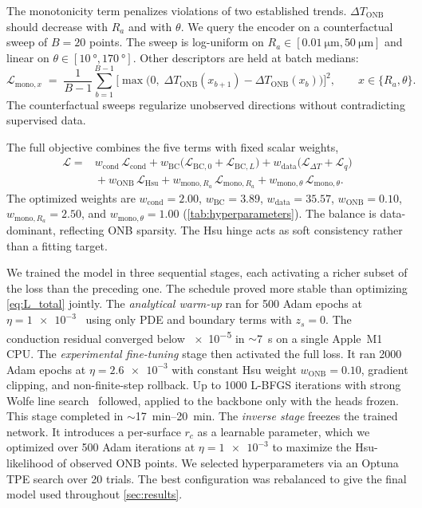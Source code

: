 The monotonicity term penalizes violations of two established trends.
$\Delta T_{\mathrm{ONB}}$ should decrease with $R_a$ and with $\theta$.
We query the encoder on a counterfactual sweep of $B=\num{20}$ points.
The sweep is log-uniform on
$R_a \in [\SI{0.01}{\micro\meter},\SI{50}{\micro\meter}]$ and linear on
$\theta \in [\SI{10}{\degree},\SI{170}{\degree}]$. Other descriptors
are held at batch medians:
%
\begin{equation}\label{eq:L_mono}
\mathcal{L}_{\mathrm{mono},x}
\;=\;
\frac{1}{B-1}
\sum_{b=1}^{B-1}
\bigl[
\max\bigl(0,\;
\Delta T_{\mathrm{ONB}}(x_{b+1}) - \Delta T_{\mathrm{ONB}}(x_{b})
\bigr)
\bigr]^{2},
\qquad x \in \{R_a, \theta\}.
\end{equation}
%
The counterfactual sweeps regularize unobserved directions without
contradicting supervised data.

The full objective combines the five terms with fixed scalar weights,
%
\begin{equation}\label{eq:L_total}
\begin{aligned}
\mathcal{L} = {}
& w_{\mathrm{cond}}\,\mathcal{L}_{\mathrm{cond}}
+ w_{\mathrm{BC}}\bigl(\mathcal{L}_{\mathrm{BC},0} + \mathcal{L}_{\mathrm{BC},L}\bigr)
+ w_{\mathrm{data}}\bigl(\mathcal{L}_{\Delta T} + \mathcal{L}_{q}\bigr) \\
& {} + w_{\mathrm{ONB}}\,\mathcal{L}_{\mathrm{Hsu}}
+ w_{\mathrm{mono},R_a}\,\mathcal{L}_{\mathrm{mono},R_a}
+ w_{\mathrm{mono},\theta}\,\mathcal{L}_{\mathrm{mono},\theta}.
\end{aligned}
\end{equation}
%
The optimized weights are $w_{\mathrm{cond}}=\num{2.00}$,
$w_{\mathrm{BC}}=\num{3.89}$, $w_{\mathrm{data}}=\num{35.57}$,
$w_{\mathrm{ONB}}=\num{0.10}$, $w_{\mathrm{mono},R_a}=\num{2.50}$, and
$w_{\mathrm{mono},\theta}=\num{1.00}$ (\cref{tab:hyperparameters}). The
balance is data-dominant, reflecting ONB sparsity. The Hsu hinge acts
as soft consistency rather than a fitting target.

We trained the model in three sequential stages, each activating a
richer subset of the loss than the preceding one. The schedule proved
more stable than optimizing \cref{eq:L_total} jointly. The \emph{analytical warm-up}
ran for \num{500} Adam epochs at $\eta=\num{1e-3}$~\citep{kingma2014adam}
using only PDE and boundary terms with $z_s=0$. The conduction
residual converged below \num{e-5} in $\sim$\SI{7}{\second} on a single
Apple~M1 CPU. The \emph{experimental fine-tuning} stage then activated
the full loss. It ran \num{2000} Adam epochs at $\eta=\num{2.6e-3}$
with constant Hsu weight $w_{\mathrm{ONB}}=\num{0.10}$, gradient
clipping, and non-finite-step rollback. Up to \num{1000} L-BFGS iterations with
strong Wolfe line search~\citep{liu1989lbfgs} followed, applied to the
backbone only with the heads frozen. This stage completed in
$\sim$\SIrange{17}{20}{\minute}. The \emph{inverse stage} freezes the
trained network. It introduces a per-surface $r_c$ as a learnable
parameter, which we optimized over \num{500} Adam iterations at
$\eta=\num{1e-3}$ to maximize the Hsu-likelihood of observed ONB
points. We selected hyperparameters via an Optuna TPE search over
\num{20} trials. The best configuration was rebalanced to give the
final model used throughout \cref{sec:results}.

